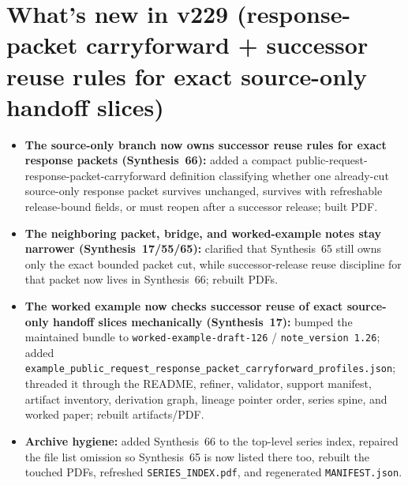 \documentclass[11pt]{article}
\begin{document}
\section{What's new in v229 (response-packet carryforward + successor reuse rules for exact source-only handoff slices)}
\begin{itemize}[leftmargin=*]
\item \textbf{The source-only branch now owns successor reuse rules for exact response packets (Synthesis~66):} added a compact public-request-response-packet-carryforward definition classifying whether one already-cut source-only response packet survives unchanged, survives with refreshable release-bound fields, or must reopen after a successor release; built PDF.
\item \textbf{The neighboring packet, bridge, and worked-example notes stay narrower (Synthesis~17/55/65):} clarified that Synthesis~65 still owns only the exact bounded packet cut, while successor-release reuse discipline for that packet now lives in Synthesis~66; rebuilt PDFs.
\item \textbf{The worked example now checks successor reuse of exact source-only handoff slices mechanically (Synthesis~17):} bumped the maintained bundle to \texttt{worked-example-draft-126} / \texttt{note\_version 1.26}; added \texttt{example\_public\_request\_response\_packet\_carryforward\_profiles.json}; threaded it through the README, refiner, validator, support manifest, artifact inventory, derivation graph, lineage pointer order, series spine, and worked paper; rebuilt artifacts/PDF.
\item \textbf{Archive hygiene:} added Synthesis~66 to the top-level series index, repaired the file list omission so Synthesis~65 is now listed there too, rebuilt the touched PDFs, refreshed \texttt{SERIES\_INDEX.pdf}, and regenerated \texttt{MANIFEST.json}.
\end{itemize}
\end{document}
